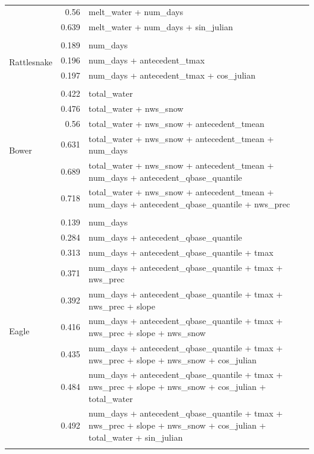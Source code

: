 \documentclass[10pt]{article}
\begin{document}
\begin{table}[h]
\begin{center}
\begin{tabular}{lrl}
 & 0.56 & melt\_water + num\_days\\ 
 & 0.639 & melt\_water + num\_days + sin\_julian\\ 
\vspace{2mm}\\ \multirow{4}{*}{Rattlesnake} & 0.189 & num\_days\\ 
 & 0.196 & num\_days + antecedent\_tmax\\ 
 & 0.197 & num\_days + antecedent\_tmax + cos\_julian\\ 
\vspace{2mm}\\ \multirow{7}{*}{Bower} & 0.422 & total\_water\\ 
 & 0.476 & total\_water + nws\_snow\\ 
 & 0.56 & total\_water + nws\_snow + antecedent\_tmean\\ 
 & 0.631 & total\_water + nws\_snow + antecedent\_tmean + num\_days\\ 
 & 0.689 & total\_water + nws\_snow + antecedent\_tmean + num\_days + antecedent\_qbase\_quantile\\ 
 & 0.718 & total\_water + nws\_snow + antecedent\_tmean + num\_days + antecedent\_qbase\_quantile + nws\_prec\\ 
\vspace{2mm}\\ \multirow{10}{*}{Eagle} & 0.139 & num\_days\\ 
 & 0.284 & num\_days + antecedent\_qbase\_quantile\\ 
 & 0.313 & num\_days + antecedent\_qbase\_quantile + tmax\\ 
 & 0.371 & num\_days + antecedent\_qbase\_quantile + tmax + nws\_prec\\ 
 & 0.392 & num\_days + antecedent\_qbase\_quantile + tmax + nws\_prec + slope\\ 
 & 0.416 & num\_days + antecedent\_qbase\_quantile + tmax + nws\_prec + slope + nws\_snow\\ 
 & 0.435 & num\_days + antecedent\_qbase\_quantile + tmax + nws\_prec + slope + nws\_snow + cos\_julian\\ 
 & 0.484 & num\_days + antecedent\_qbase\_quantile + tmax + nws\_prec + slope + nws\_snow + cos\_julian + total\_water\\ 
 & 0.492 & num\_days + antecedent\_qbase\_quantile + tmax + nws\_prec + slope + nws\_snow + cos\_julian + total\_water + sin\_julian\\ 
\vspace{2mm}\\     \end{tabular}
    \caption{\label{sed_r_square_nosnow}}
    \end{center}
\end{table}
\end{document}
